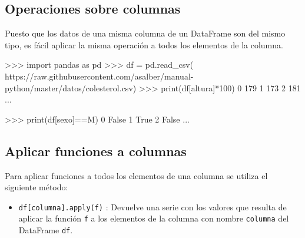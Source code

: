\documentclass[
  spanish,
  a4paper,
]{scrreport}
\newenvironment{Shaded}{\begin{snugshade}}{\end{snugshade}}
\newcommand{\BuiltInTok}[1]{\textcolor[rgb]{0.00,0.23,0.31}{#1}}
\newcommand{\DecValTok}[1]{\textcolor[rgb]{0.68,0.00,0.00}{#1}}
\newcommand{\ImportTok}[1]{\textcolor[rgb]{0.00,0.46,0.62}{#1}}
\newcommand{\NormalTok}[1]{\textcolor[rgb]{0.00,0.23,0.31}{#1}}
\newcommand{\OperatorTok}[1]{\textcolor[rgb]{0.37,0.37,0.37}{#1}}
\newcommand{\StringTok}[1]{\textcolor[rgb]{0.13,0.47,0.30}{#1}}
\newcommand{\VariableTok}[1]{\textcolor[rgb]{0.07,0.07,0.07}{#1}}
\providecommand{\tightlist}{%
  \setlength{\itemsep}{0pt}\setlength{\parskip}{0pt}}
\begin{document}
\subsection{Operaciones sobre
columnas}\label{operaciones-sobre-columnas}

Puesto que los datos de una misma columna de un DataFrame son del mismo
tipo, es fácil aplicar la misma operación a todos los elementos de la
columna.

\begin{Shaded}
\begin{Highlighting}[]
\OperatorTok{\textgreater{}\textgreater{}\textgreater{}} \ImportTok{import}\NormalTok{ pandas }\ImportTok{as}\NormalTok{ pd}
\OperatorTok{\textgreater{}\textgreater{}\textgreater{}}\NormalTok{ df }\OperatorTok{=}\NormalTok{ pd.read\_csv(}
\StringTok{\textquotesingle{}https://raw.githubusercontent.com/asalber/manual{-}python/master/datos/colesterol.csv\textquotesingle{}}\NormalTok{)}
\OperatorTok{\textgreater{}\textgreater{}\textgreater{}} \BuiltInTok{print}\NormalTok{(df[}\StringTok{\textquotesingle{}altura\textquotesingle{}}\NormalTok{]}\OperatorTok{*}\DecValTok{100}\NormalTok{)}
\DecValTok{0}     \DecValTok{179}
\DecValTok{1}     \DecValTok{173}
\DecValTok{2}     \DecValTok{181}
\NormalTok{...}

\OperatorTok{\textgreater{}\textgreater{}\textgreater{}} \BuiltInTok{print}\NormalTok{(df[}\StringTok{\textquotesingle{}sexo\textquotesingle{}}\NormalTok{]}\OperatorTok{==}\StringTok{\textquotesingle{}M\textquotesingle{}}\NormalTok{)}
\DecValTok{0}     \VariableTok{False}
\DecValTok{1}      \VariableTok{True}
\DecValTok{2}     \VariableTok{False}
\NormalTok{...}
\end{Highlighting}
\end{Shaded}

\subsection{Aplicar funciones a
columnas}\label{aplicar-funciones-a-columnas}

Para aplicar funciones a todos los elementos de una columna se utiliza
el siguiente método:

\begin{itemize}
\tightlist
\item
  \texttt{df{[}columna{]}.apply(f)} : Devuelve una serie con los valores
  que resulta de aplicar la función \texttt{f} a los elementos de la
  columna con nombre \texttt{columna} del DataFrame \texttt{df}.
\end{itemize}
\end{document}
